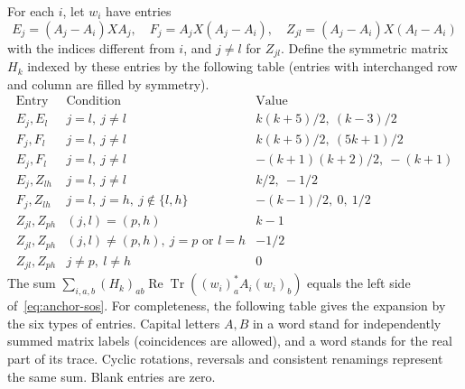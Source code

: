 \documentclass[11pt]{article}
\newcommand{\Tr}{\operatorname{Tr}}
\begin{document}
For each \(i\), let \(w_i\) have entries
\[
 E_j=(A_j-A_i)XA_j,\quad F_j=A_jX(A_j-A_i),\quad
 Z_{jl}=(A_j-A_i)X(A_l-A_i)
\]
with the indices different from \(i\), and \(j\ne l\) for \(Z_{jl}\).
Define the symmetric matrix \(H_k\) indexed by these entries by
the following table (entries with interchanged row and column
are filled by symmetry).
\[
\begin{array}{lll}
\text{Entry} & \text{Condition} & \text{Value}\\ \hline
E_j,E_l & j=l,\ j\ne l & k(k+5)/2,\ (k-3)/2\\
F_j,F_l & j=l,\ j\ne l & k(k+5)/2,\ (5k+1)/2\\
E_j,F_l & j=l,\ j\ne l & -(k+1)(k+2)/2,\ -(k+1)\\
E_j,Z_{lh} & j=l,\ j\ne l & k/2,\ -1/2\\
F_j,Z_{lh} & j=l,\ j=h,\ j\notin\{l,h\} & -(k-1)/2,\ 0,\ 1/2\\
Z_{jl},Z_{ph} & (j,l)=(p,h) & k-1\\
Z_{jl},Z_{ph} & (j,l)\ne(p,h),\ j=p\text{ or }l=h & -1/2\\
Z_{jl},Z_{ph} & j\ne p,\ l\ne h & 0
\end{array}
\]
The sum \(\sum_{i,a,b}(H_k)_{ab}\operatorname{Re}\Tr
((w_i)_a^* A_i(w_i)_b)\) equals the left side
of~\eqref{eq:anchor-sos}. For completeness, the following
table gives the expansion by the six types of entries. Capital
letters \(A,B\) in a word stand for independently summed
matrix labels (coincidences are allowed), and a word stands for
the real part of its trace. Cyclic rotations, reversals and
consistent renamings represent the same sum. Blank entries are zero.
\end{document}
